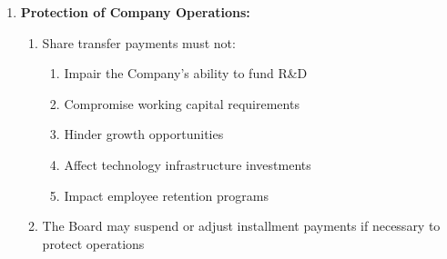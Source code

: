 \begin{enumerate}[label=(\alph*)]
\item \textbf{Protection of Company Operations:}
    \begin{enumerate}[label=(\roman*)]
    \item Share transfer payments must not:
        \begin{enumerate}[label=(\alph*)]
        \item Impair the Company's ability to fund R\&D
        \item Compromise working capital requirements
        \item Hinder growth opportunities
        \item Affect technology infrastructure investments
        \item Impact employee retention programs
        \end{enumerate}
    \item The Board may suspend or adjust installment payments if necessary to protect operations
    \end{enumerate}


\end{enumerate}

